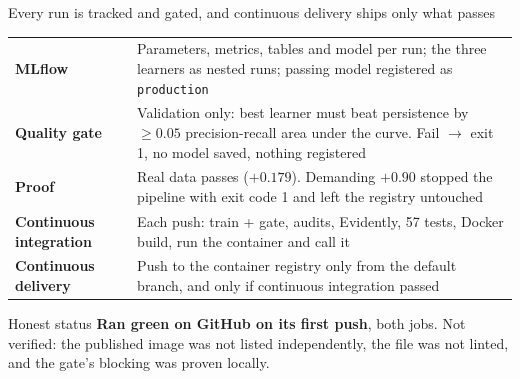 \documentclass[aspectratio=169,11pt]{beamer}
\newcommand{\code}[1]{\texttt{#1}}
\begin{document}
\begin{frame}{Every run is tracked and gated, and continuous delivery ships only what passes}
  \footnotesize
  \begin{tabular}{@{}>{\raggedright\arraybackslash}p{3.4cm}>{\raggedright\arraybackslash}p{9.8cm}@{}}
    \toprule
    \textbf{MLflow} & Parameters, metrics, tables and model per run; the three learners as nested runs; passing model registered as \code{production} \\
    \textbf{Quality gate} & Validation only: best learner must beat persistence by $\ge 0.05$ precision-recall area under the curve. Fail $\to$ exit 1, no model saved, nothing registered \\
    \textbf{Proof} & Real data passes ($+0.179$). Demanding $+0.90$ stopped the pipeline with exit code 1 and left the registry untouched \\
    \textbf{Continuous integration} & Each push: train + gate, audits, Evidently, 57 tests, Docker build, run the container and call it \\
    \textbf{Continuous delivery} & Push to the container registry only from the default branch, and only if continuous integration passed \\
    \bottomrule
  \end{tabular}
  \vspace{6pt}
  \begin{alertblock}{Honest status}
    \small \textbf{Ran green on GitHub on its first push}, both jobs. Not verified: the published image was not listed independently, the file was not linted, and the gate's blocking was proven locally.
  \end{alertblock}
\end{frame}
\end{document}
